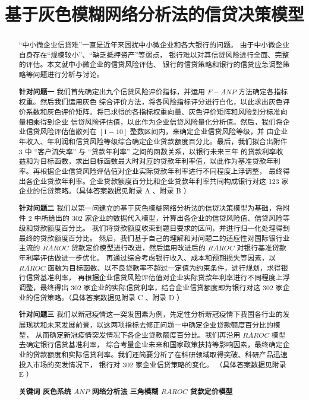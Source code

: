 \documentclass[withoutpreface,bwprint]{cumcmthesis}
\title{基于灰色模糊网络分析法的信贷决策模型} %
\begin{document}
\maketitle
\begin{abstract}
    ``中小微企业信贷难''一直是近年来困扰中小微企业和各大银行的问题。
    由于中小微企业自身存在``规模较小''、``缺乏抵押资产''等弱点，
    银行难以对其信贷风险进行全面、完整的评估。本文就中小微企业的信贷风险评估、
    银行的信贷策略和银行的信贷应急调整策略等问题进行分析与讨论。\par
    \textbf{针对问题一}\quad 
        我们首先确定出九个信贷风险评价指标，并运用 $F - ANP$ 方法确定各指标权重。然后我们运用灰色
        综合评价方法，将各风险指标评分进行白化，以此求出灰色评价系数和灰色评价矩阵。将已求得的各指标权重向量、灰色评价矩阵和风险划分标准向量相乘得到企业
        信贷风险评估值，以此作为企业信贷风险量化分析值。然后，我们将企业信贷风险评估值散列在 $\left[1 - 10\right]$ 整数区间内，来确定企业信贷风险等级，并
        由企业年收入、年利润和信贷风险等级综合确定企业贷款额度百分比。最后，我们拟合出附件 3 中 ``客户流失率'' 与 ``贷款年利率'' 之间的函数关系，以银行未来三年
        的贷款利率收益和为目标函数，求出目标函数最大时对应的贷款年利率值，以此作为基准贷款年利率。再根据企业信贷风险评估值对企业实际贷款年利率进行不同程度上浮调整，
        最终得出各企业贷款年利率。企业贷款额度百分比和企业贷款年利率共同构成银行对这 123 家企业的信贷策略。（具体答案数据见附录 A 、附录 B ）\par
    \textbf{针对问题二}\quad
        我们以第一问建立的基于灰色模糊网络分析法的信贷决策模型为基础，将附件 2 中所给出的 302 家企业的数据代入模型，计算出各企业的信贷风险值、信贷风险等级和贷款额度百分比。
        我们将贷款额度收束到题目要求的区间，并进行归一化处理得到最终的贷款额度百分比。
        然后，我们基于自己的理解和对问题二的适应性对国际银行业主流的 $RAROC$ 贷款定价模型进行改进，然后运用改进后的 $RAROC$ 对银行基准贷款年利率评估做进一步优化。
        再通过综合考虑银行收入、成本和预期损失等因素，以 $RAROC$ 函数为目标函数、以不良贷款率不超过一定值为约束条件，进行规划，求得银行信贷基准利率，
        再根据企业信贷风险评估值对企业实际贷款年利率进行不同程度上浮调整，最终得出 302 家企业的实际信贷利率，结合企业信贷额度即为银行对这 302 家企业的信贷策略。（具体答案数据见附录 C 、附录 D ）\par
    \textbf{针对问题三}\quad
        我们以新冠疫情这一突发因素为例，先定性分析新冠疫情下我国各行业的发展现状和未来发展前景，以这两项指标去修正问题一中确定企业贷款额度百分比的模型，
        从而确定新冠疫情突发情况下各企业贷款额度百分比。我们再沿用 $RAROC$ 模型去确定银行信贷基准利率，
        综合考量企业未来和国家政策扶持等影响因素，最终确定企业的贷款额度和实际信贷利率。我们还简要分析了在科研领域取得突破、科研产品迅速投入市场的突发情况下，
        银行对 302 家企业信贷策略的变化。
        （具体答案数据见附录 E ）\par
    \textbf{关键词 \quad 灰色系统 \quad $ANP$ 网络分析法 \quad 三角模糊 \quad $RAROC$ 贷款定价模型 \quad} %
    \end{abstract}
\end{document}
